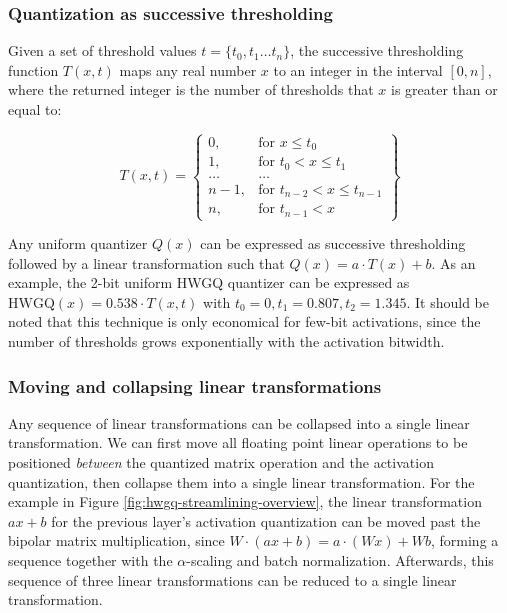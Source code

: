 \documentclass[sigconf]{acmart}
\begin{document}
\subsubsection{Quantization as successive thresholding} Given a set of threshold values $t = \{t_0, t_1 \dots t_{n}\}$,
the successive thresholding function $T(x, t)$ maps any real number $x$ to an integer in the interval $[0, n]$, where the returned integer is the number of thresholds that $x$ is greater than or equal to:

\[
T(x, t) = \left\{\begin{array}{lr}
0, & \text{for } x \leq t_0\\
1, & \text{for } t_0 < x \leq t_1\\
\dots & \dots \\
n-1, & \text{for } t_{n-2} < x \leq t_{n-1}\\
n, & \text{for } t_{n-1} < x
\end{array}\right\}
\]

Any uniform quantizer $Q(x)$ can be expressed as successive thresholding followed by a linear transformation such that $Q(x) = a \cdot T(x)+b$.
As an example, the 2-bit uniform HWGQ quantizer can be expressed as $\mathrm{HWGQ}(x) = 0.538 \cdot T(x, t)$ with $t_0 = 0, t_1 = 0.807, t_2 = 1.345$.
It should be noted that this technique is only economical for few-bit activations, since the number of thresholds grows exponentially with the activation bitwidth.

\subsubsection{Moving and collapsing linear transformations}
Any sequence of linear transformations can be collapsed into a single linear transformation.
We can first move all floating point linear operations to be positioned \emph{between} the quantized matrix operation and the activation quantization, then collapse them into a single linear transformation.
For the example in Figure \ref{fig:hwgq-streamlining-overview}, the linear transformation $ax+b$ for the previous layer's activation quantization can be moved past the bipolar matrix multiplication, since $W\cdot (ax+b) = a\cdot(Wx) + Wb$, forming a sequence together with the $\alpha$-scaling and batch normalization.
Afterwards, this sequence of three linear transformations can be reduced to a single linear transformation.
\end{document}
